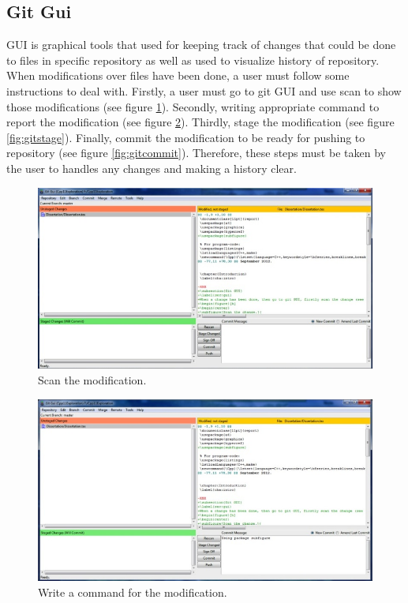 \documentclass[11pt]{report}
\begin{document}
\subsection{Git Gui}
\label{subsec: gitgui}
GUI is graphical tools that used for keeping track of changes that could be done to files in specific repository as well as used to visualize history of repository. When modifications over files have been done, a user must follow some instructions to deal with. Firstly, a user must go to git GUI and use scan to show those modifications (see figure \ref{fig:gitscan}). Secondly, writing appropriate command to report the modification (see figure \ref{fig:gitcommand}). Thirdly, stage the modification (see figure \ref{fig:gitstage}). Finally, commit the modification to be ready for pushing to repository (see figure \ref{fig:gitcommit}). Therefore, these steps must be taken by the user to handles any changes and making a history clear.
\begin{figure}[h]
\begin{center}
\includegraphics[scale=0.50]{../GitPhotos/GitScan.jpg}
\caption{Scan the modification.}
\label{fig:gitscan}
\end{center}
\end{figure}
\begin{figure}[h]
\begin{center}
\includegraphics[scale=0.50]{../GitPhotos/GitCommand.jpg}
\caption{Write a command for the modification.}
\label{fig:gitcommand}
\end{center}
\end{figure}
\end{document}
